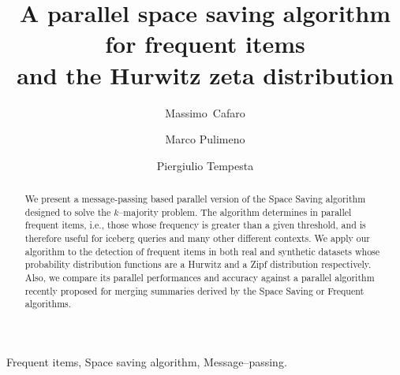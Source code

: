 \documentclass[final,3p,times]{elsarticle}
\begin{document}
\begin{frontmatter}
\title{A parallel space saving algorithm for frequent items  \\ and the Hurwitz zeta distribution}
\author [unile] {Massimo~Cafaro}
\author [unile] {Marco Pulimeno}
\author [comp] {Piergiulio Tempesta}
\address[unile]{University of Salento, Lecce, Italy}
\address[comp]{Departamento de F\'{\i}sica Te\'{o}rica II, Facultad de F\'{\i}sicas, Universidad
Complutense, 28040 -- Madrid, Spain and Instituto de Ciencias Matem\'aticas, C/ Nicol\'as Cabrera, No 13--15, 28049 Madrid, Spain}


\begin{abstract} We present a message-passing based parallel version of the Space Saving algorithm designed to solve the $k$--majority problem. The algorithm determines in parallel frequent items, i.e., those whose frequency is greater than a given threshold, and is therefore useful for iceberg queries and many other different contexts. We apply our algorithm to the detection of frequent items in both real and synthetic datasets whose probability distribution functions are a Hurwitz and a Zipf distribution respectively. Also, we compare its parallel performances and accuracy against a parallel algorithm recently proposed for merging summaries derived by the Space Saving or Frequent algorithms.
\end{abstract}

\begin{keyword}
Frequent items, Space saving algorithm, Message--passing.
\end{keyword}

\newtheorem{thm}{Theorem}
\newtheorem{lem}[thm]{Lemma}
\newtheorem{prop}[thm]{Proposition}
\newtheorem*{cor}{Corollary}

\newtheorem{conj}{Conjecture}
\newtheorem{exmp}{Example}
\newtheorem{case}{Case}

\end{frontmatter}
\end{document}
